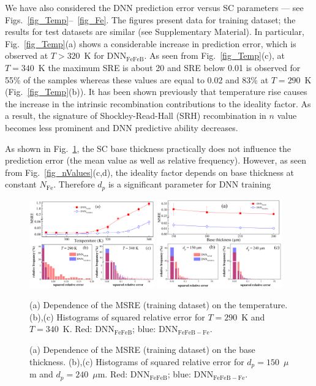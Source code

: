 \documentclass[num-refs]{wiley-article} %
\begin{document}
We have also considered the DNN prediction error versus SC parameters  ---
see Figs.~\ref{fig_Temp}--~\ref{fig_Fe}.
The figures present data for training dataset; the results for test datasets are similar
(see Supplementary Material).
In particular, Fig.~\ref{fig_Temp}(a) shows a considerable increase in prediction error,
which is observed at $T>320$~K for DNN$_\mathrm{FeFeB}$.
As seen from Fig.~\ref{fig_Temp}(c), at $T=340$~K the maximum SRE is about 20 and
SRE below 0.01 is observed for 55\% of the samples
whereas these values are equal to 0.02 and 83\% at $T=290$~K
(Fig.~\ref{fig_Temp}(b)).
It has been shown previously \cite{OlikhJPS} that temperature rise causes the increase in
the intrinsic recombination contributions to the ideality factor.
As a result, the signature of Shockley-Read-Hall (SRH) recombination in $n$ value becomes less prominent
and DNN predictive ability decreases.

As shown in Fig.~\ref{fig_depth}, the SC base thickness practically does not influence the prediction error
(the mean value as well as relative frequency).
However, as seen from Fig.~\ref{fig_nValues}(c,d),
the ideality factor depends on base thickness at constant $N_\mathrm{Fe}$.
Therefore $d_p$ is a significant parameter for DNN training


\begin{figure}[tb]
\centering
\includegraphics[width=0.48\textwidth]{F4} \hfill
\includegraphics[width=0.48\textwidth]{F5} \\
\parbox[t]{0.48\textwidth}
{\caption{(a) Dependence of the MSRE (training dataset) on the temperature.
(b),(c) Histograms of squared relative error for $T=290$~K and $T=340$~K.
Red: DNN$_\mathrm{FeFeB}$; blue: DNN$_\mathrm{FeFeB-Fe}$.
}
\label{fig_Temp}} \hfill
\parbox[t]{0.48\textwidth}{\caption{(a) Dependence of the MSRE (training dataset) on the base thickness.
(b),(c) Histograms of squared relative error for $d_p=150$~$\mu$m and $d_p=240$~$\mu$m.
Red: DNN$_\mathrm{FeFeB}$; blue: DNN$_\mathrm{FeFeB-Fe}$.}
\label{fig_depth}}
\end{figure}
\end{document}
